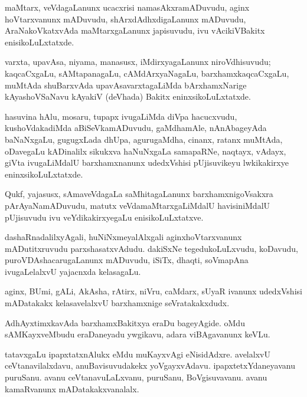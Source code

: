 \documentclass{article}
\begin{document}
\begin{mn}
maMtarx, veVdagaLanunx ucacxrisi namasAkxramADuvudu, aginx
hoVtarxvanunx mADuvudu, shArxdAdhxdigaLanunx mADuvudu,
AraNakoVkatxvAda maMtarxgaLanunx japisuvudu, ivu vAcikiVBakitx enisikoLuLxtatxde.
\end{mn}

\begin{mn}%
varxta, upavAsa, niyama, manasusx, iMdirxyagaLanunx niroVdhisuvudu;
kaqcaCxgaLu, sAMtapanagaLu, cAMdArxyaNagaLu, barxhamxkaqcaCxgaLu,
muMtAda shuBarxvAda upavAsavarxtagaLiMda bArxhamxNarige kAyashoVSaNavu
kAyakiV (deVhada) Bakitx eninxsikoLuLxtatxde.
\end{mn}

\begin{mn}
hasuvina hAlu, mosaru, tupapx ivugaLiMda diVpa hacucxvudu,
kushoVdakadiMda aBiSeVkamADuvudu, gaMdhamAle, nAnAbageyAda baNaNxgaLu,
gugugxLada dhUpa, agurugaMdha, cinanx, ratanx muMtAda, oDavegaLu
kADinalilx sikukxva haNuNxgaLa samapaRNe, naqtayx, vAdayx, giVta
ivugaLiMdalU barxhamxnanunx udedxVshisi pUjisuvikeyu lwkikakirxye eninxsikoLuLxtatxde.
\end{mn}

\begin{mn}%
Qukf, yajasusx, sAmaveVdagaLa saMhitagaLanunx barxhamxnigoVsakxra
pArAyaNamADuvudu, matutx veVdamaMtarxgaLiMdalU havisiniMdalU
pUjisuvudu ivu veYdikakirxyegaLu enisikoLuLxtatxve.
\end{mn}

\begin{mn}
dashaRnadalilxyAgali, huNiNxmeyalAlxgali aginxhoVtarxvanunx
mADutitxruvudu parxshasatxvAdudu. dakiSxNe tegedukoLuLxvudu, koDavudu,
puroVDAshacarugaLanunx mADuvudu, iSiTx, dhaqti, soVmapAna
ivugaLelalxvU yajacnxda kelasagaLu.
\end{mn}

\begin{mn}
aginx, BUmi, gALi, AkAsha, rAtirx, niVru, caMdarx, sUyaR ivanunx
udedxVshisi mADatakakx kelasavelalxvU barxhamxnige seVratakakxdudx.
\end{mn}

\begin{mn}
AdhAyxtimxkavAda barxhamxBakitxya eraDu bageyAgide. oMdu
sAMKayxveMbudu eraDaneyadu ywgikavu, adara viBAgavanunx keVLu.
\end{mn}

\begin{mn}
tatavxgaLu ipapxtatxnAlukx eMdu muKayxvAgi eNisidAdxre. avelalxvU
ceVtanavilalxdavu, anuBavisuvudakekx
yoVgayxvAdavu. ipapxtetxYdaneyavanu puruSanu. avanu ceVtanavuLaLxvanu,
puruSanu, BoVgisuvavanu. avanu kamaRvanunx mADatakakxvanalalx.
\end{mn}
\end{document}
